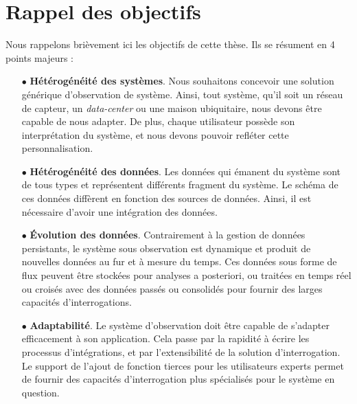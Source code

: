 \section{Rappel des objectifs}\label{sec:conclusion:objectifs}
Nous rappelons brièvement ici les objectifs de cette thèse. Ils se résument en 4 points majeurs :
\begin{itemize}
	\item[$\bullet$] \textbf{Hétérogénéité des systèmes}. Nous souhaitons concevoir une solution générique d'observation de système. Ainsi, tout système, qu'il soit un réseau de capteur, un \textit{data-center} ou une maison ubiquitaire, nous devons être capable de nous adapter. De plus, chaque utilisateur possède son interprétation du système, et nous devons pouvoir refléter cette personnalisation.
	\item[$\bullet$] \textbf{Hétérogénéité des données}. Les données qui émanent du système sont de tous types et représentent différents fragment du système. Le schéma de ces données diffèrent en fonction des sources de données. Ainsi, il est nécessaire d'avoir une intégration des données.
	\item[$\bullet$] \textbf{Évolution des données}. Contrairement à la gestion de données persistants, le système sous observation est dynamique et produit de nouvelles données au fur et à mesure du temps. Ces données sous forme de flux peuvent être stockées pour analyses a posteriori, ou traitées en temps réel ou croisés avec des données passés ou consolidés pour fournir des larges capacités d'interrogations.
	\item[$\bullet$] \textbf{Adaptabilité}. Le système d'observation doit être capable de s'adapter efficacement à son application. Cela passe par la rapidité à écrire les processus d'intégrations, et par l'extensibilité de la solution d'interrogation. Le support de l'ajout de fonction tierces pour les utilisateurs experts permet de fournir des capacités d'interrogation plus spécialisés pour le système en question.
\end{itemize}